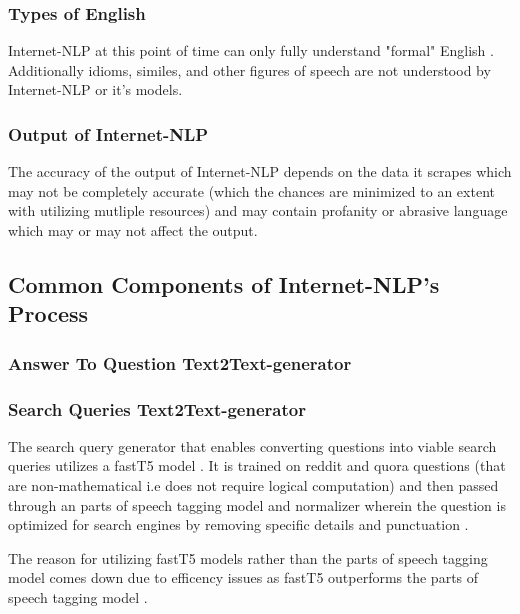 \subsubsection{Types of English}

Internet-NLP at this point of time can only fully understand "formal" English \cite{FormalInformal}. Additionally idioms, similes, and other figures of speech are not understood by Internet-NLP or it's models.

\subsubsection{Output of Internet-NLP}

The accuracy of the output of Internet-NLP depends on the data it scrapes which may not be completely accurate (which the chances are minimized to an extent with utilizing mutliple resources) and may contain profanity or abrasive language which may or may not affect the output.

\subsection{Common Components of Internet-NLP's Process}

\subsubsection{Answer To Question Text2Text-generator\label{subsubsection:AnswerToQuestion}}

\subsubsection{Search Queries Text2Text-generator \label{subsubsection:search-query}}

The search query generator that enables converting questions into viable search queries utilizes a fastT5 model \cite{2019t5}. It is trained on reddit and quora questions (that are non-mathematical i.e does not require logical computation) and then passed through an parts of speech tagging model and normalizer wherein the question is optimized for search engines by removing specific details and punctuation \cite{BetterWebSearches}. 

The reason for utilizing fastT5 models rather than the parts of speech tagging model comes down due to efficency issues as fastT5 outperforms the parts of speech tagging model \cite{inproceedings, 2019t5}. 

